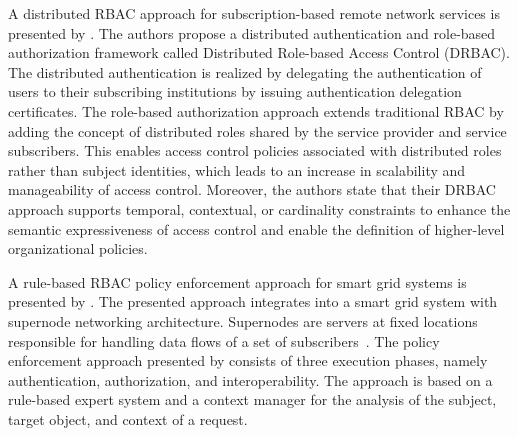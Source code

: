 A distributed RBAC approach for subscription-based remote network services is presented by \citeauthor{Ma2006} \cite{Ma2006a,Ma2006}.
The authors propose a distributed authentication and role-based authorization framework called Distributed Role-based Access Control (DRBAC).
The distributed authentication is realized by delegating the authentication of users to their subscribing institutions by issuing authentication delegation certificates.
The role-based authorization approach extends traditional RBAC by adding the concept of distributed roles shared by the service provider and service subscribers.
This enables access control policies associated with distributed roles rather than subject identities, which leads to an increase in scalability and manageability of access control.
Moreover, the authors state that their DRBAC approach supports temporal, contextual, or cardinality constraints to enhance the semantic expressiveness of access control and enable the definition of higher-level organizational policies.

A rule-based RBAC policy enforcement approach for smart grid systems is presented by \citeauthor{Alcaraz2016} \cite{Alcaraz2016}.
The presented approach integrates into a smart grid system with supernode networking architecture.
Supernodes are servers at fixed locations responsible for handling data flows of a set of subscribers~\cite{Samuel2008}.
The policy enforcement approach presented by \citeauthor{Alcaraz2016} consists of three execution phases, namely authentication, authorization, and interoperability.
The approach is based on a rule-based expert system and a context manager for the analysis of the subject, target object, and context of a request.
